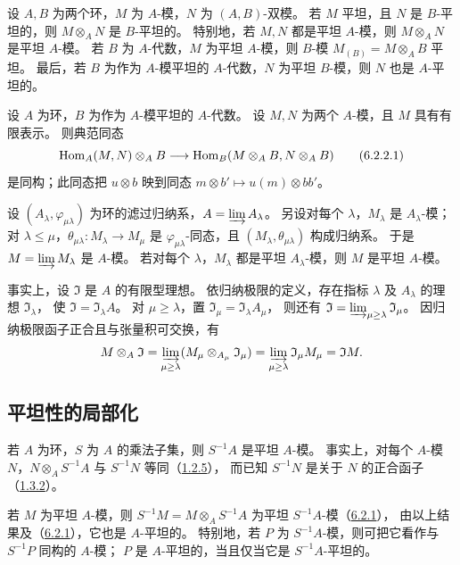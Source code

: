 设 $A,B$ 为两个环，$M$ 为 $A$-模，$N$ 为 $(A,B)$-双模。
若 $M$ 平坦，且 $N$ 是 $B$-平坦的，则 $M\otimes_A N$ 是 $B$-平坦的。
特别地，若 $M,N$ 都是平坦 $A$-模，则 $M\otimes_A N$ 是平坦 $A$-模。
若 $B$ 为 $A$-代数，$M$ 为平坦 $A$-模，则 $B$-模 $M_{(B)}=M\otimes_A B$ 平坦。
最后，若 $B$ 为作为 $A$-模平坦的 $A$-代数，$N$ 为平坦 $B$-模，则 $N$ 也是 $A$-平坦的。

设 $A$ 为环，$B$ 为作为 $A$-模平坦的 $A$-代数。
设 $M,N$ 为两个 $A$-模，且 $M$ 具有有限表示。
则典范同态
\begin{equation}
 \operatorname{Hom}_A(M,N)\otimes_A B
 \longrightarrow\operatorname{Hom}_B(M\otimes_A B,N\otimes_A B)
 \tag{6.2.2.1}\label{eq:0:6.2.2.1}
\end{equation}
是同构；此同态把 $u\otimes b$ 映到同态
$m\otimes b'\mapsto u(m)\otimes bb'$。

设 $(A_\lambda,\varphi_{\mu\lambda})$ 为环的滤过归纳系，$A=\varinjlim A_\lambda$。
另设对每个 $\lambda$，$M_\lambda$ 是 $A_\lambda$-模；
对 $\lambda\leq\mu$，$\theta_{\mu\lambda}\colon M_\lambda\to M_\mu$ 是
$\varphi_{\mu\lambda}$-同态，且 $(M_\lambda,\theta_{\mu\lambda})$ 构成归纳系。
于是 $M=\varinjlim M_\lambda$ 是 $A$-模。
若对每个 $\lambda$，$M_\lambda$ 都是平坦 $A_\lambda$-模，则 $M$ 是平坦 $A$-模。

事实上，设 $\mathfrak I$ 是 $A$ 的有限型理想。
依归纳极限的定义，存在指标 $\lambda$ 及 $A_\lambda$ 的理想 $\mathfrak I_\lambda$，
使 $\mathfrak I=\mathfrak I_\lambda A$。
对 $\mu\geq\lambda$，置 $\mathfrak I_\mu=\mathfrak I_\lambda A_\mu$，
则还有 $\mathfrak I=\varinjlim_{\mu\geq\lambda}\mathfrak I_\mu$。
因归纳极限函子正合且与张量积可交换，有
\[
 M\otimes_A\mathfrak I
 =\varinjlim_{\mu\geq\lambda}(M_\mu\otimes_{A_\mu}\mathfrak I_\mu)
 =\varinjlim_{\mu\geq\lambda}\mathfrak I_\mu M_\mu
 =\mathfrak I M.
\]

\subsection{平坦性的局部化}\hypertarget{heading:0:6.3}{}

若 $A$ 为环，$S$ 为 $A$ 的乘法子集，则 $S^{-1}A$ 是平坦 $A$-模。
事实上，对每个 $A$-模 $N$，$N\otimes_A S^{-1}A$ 与 $S^{-1}N$ 等同（\hyperlink{para:0:1.2.5}{1.2.5}），
而已知 $S^{-1}N$ 是关于 $N$ 的正合函子（\hyperlink{para:0:1.3.2}{1.3.2}）。

若 $M$ 为平坦 $A$-模，则 $S^{-1}M=M\otimes_A S^{-1}A$ 为平坦 $S^{-1}A$-模（\hyperlink{para:0:6.2.1}{6.2.1}），
由以上结果及（\hyperlink{para:0:6.2.1}{6.2.1}），它也是 $A$-平坦的。
特别地，若 $P$ 为 $S^{-1}A$-模，则可把它看作与 $S^{-1}P$ 同构的 $A$-模；
$P$ 是 $A$-平坦的，当且仅当它是 $S^{-1}A$-平坦的。

